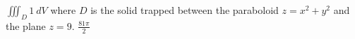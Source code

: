 {$\iiint_D 1 \: dV$ where $D$ is the solid trapped between the paraboloid $z = x^2 + y^2$ and the plane $z = 9$.
}
{$\frac{81\pi}{2}$}